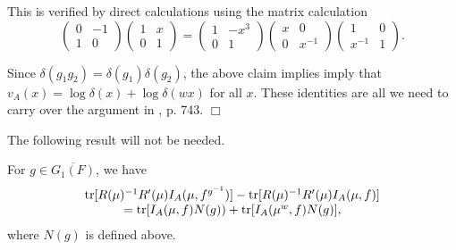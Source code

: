 This is verified by direct calculations using the matrix calculation
\[
\left(
\begin{array}{cc}
0 & -1\\
1 & 0
\end{array}
\right)
\left(
\begin{array}{cc}
1 & x\\
0 & 1
\end{array}
\right)
=
\left(
\begin{array}{cc}
1 & -x^3\\
0 & 1
\end{array}
\right)
\left(
\begin{array}{cc}
x & 0\\
0 & x^{-1}
\end{array}
\right)
\left(
\begin{array}{cc}
1 & 0\\
x^{-1} & 1
\end{array}
\right).
\]

Since
$\delta(g_1g_2)=\delta(g_1)\delta(g_2)$,
the above claim implies imply that
$v_A(x)=\log\delta(x)+\log\delta(wx)$ for all $x$.
These identities are all we need to carry over the argument
in \cite{LL}, p. 743. $\Box$

The following result will not be needed.

\begin{lemma} For $g\in\overline{G_1(F)}$, we have
\[
\begin{array}{c}
{\rm tr}[R(\mu)^{-1}R'(\mu)I_A(\mu,f^{g^{-1}})]
-{\rm tr}[R(\mu)^{-1}R'(\mu)I_A(\mu,f)]\\
={\rm tr}[I_A(\mu,f)N(g))+
{\rm tr}[I_A(\mu^w,f)N(g)],
\end{array}
\]
where $N(g)$ is defined above.
\end{lemma}

